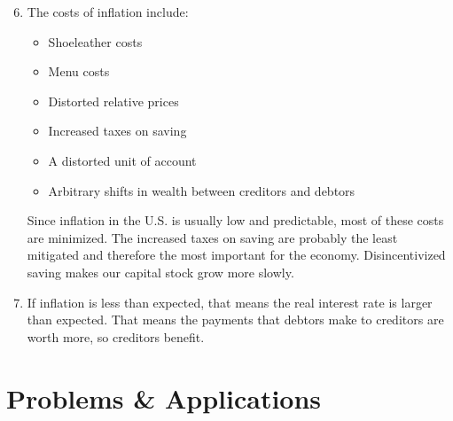 \documentclass{article}
\begin{document}
\begin{enumerate}

\setcounter{enumi}{5}

\item The costs of inflation include:

	\begin{itemize}

	\item Shoeleather costs
	
	\item Menu costs
	
	\item Distorted relative prices
	
	\item Increased taxes on saving
	
	\item A distorted unit of account
	
	\item Arbitrary shifts in wealth between creditors and debtors
	
	\end{itemize}
	
	Since inflation in the U.S. is usually low and predictable, most of these costs are minimized. The increased taxes on saving are probably the least mitigated and therefore the most important for the economy. Disincentivized saving makes our capital stock grow more slowly.

\item If inflation is less than expected, that means the real interest rate is larger than expected. That means the payments that debtors make to creditors are worth more, so creditors benefit.

\end{enumerate}

\section*{Problems \& Applications}
\end{document}
